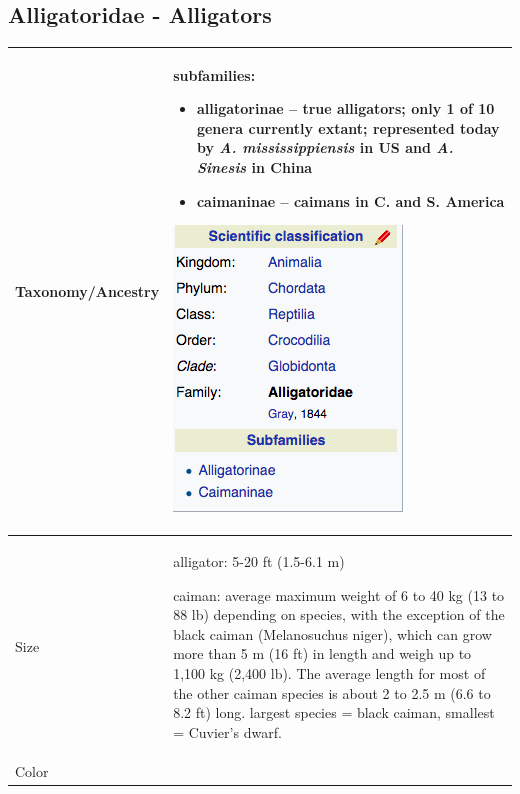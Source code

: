 
\subsection{Alligatoridae - Alligators}
\begin{center}
\begin{longtabu} to 

	\hline
	Taxonomy/Ancestry &
	subfamilies:
	\begin{itemize}[noitemsep]
		\item \textbf{alligatorinae} -- true alligators; only 1 of 10 genera currently extant; represented today by \emph{A. mississippiensis} in US and \emph{A. Sinesis} in China
		\item \textbf{caimaninae} -- caimans in C. and S. America
	\end{itemize}
	
	\begin{center} \includegraphics[scale=0.5]{crocodylia/alligatoridae/taxonomy} \end{center}
	 \\
	\hline
	Size & 
	alligator: 5-20 ft (1.5-6.1 m)
	
	caiman: average maximum weight of 6 to 40 kg (13 to 88 lb) depending on species, with the exception of the black caiman (Melanosuchus niger), which can grow more than 5 m (16 ft) in length and weigh up to 1,100 kg (2,400 lb). The average length for most of the other caiman species is about 2 to 2.5 m (6.6 to 8.2 ft) long. largest species = black caiman, smallest = Cuvier's dwarf.
	\\
	\hline
	Color &
	

\end{longtabu}
\end{center}
